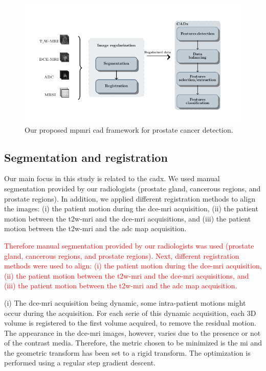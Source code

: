 \documentclass[a4paper,num-refs]{wiley-article}
\begin{document}
\begin{figure}
  \centering
  \includegraphics[width=0.7\linewidth]{./images/cad/wkfcad.pdf}
  \caption{Our proposed \ac{mpmri} \ac{cad} framework for prostate cancer
    detection.}
  \label{fig:wkfcad}
\end{figure}

\subsection{Segmentation and registration}

Our main focus in this study is related to the \ac{cadx}. We used manual
segmentation provided by our radiologists (prostate gland, cancerous regions,
and prostate regions). In addition, we applied different registration methods
to align the images: (i) the patient motion during the \ac{dce}-\ac{mri}
acquisition, (ii) the patient motion between the \ac{t2w}-\ac{mri} and the
\ac{dce}-\ac{mri} acquisitions, and (iii) the patient motion between the
\ac{t2w}-\ac{mri} and the \ac{adc} map acquisition.

\textcolor{red}{Therefore manual segmentation provided by our radiologists was
  used (prostate gland, cancerous regions, and prostate regions).  Next,
  different registration methods were used to align: (i) the patient motion
  during the \ac{dce}-\ac{mri} acquisition, (ii) the patient motion between the
  \ac{t2w}-\ac{mri} and the \ac{dce}-\ac{mri} acquisitions, and (iii) the
  patient motion between the \ac{t2w}-\ac{mri} and the \ac{adc} map
  acquisition.}

(i) The \ac{dce}-\ac{mri} acquisition being dynamic, some intra-patient motions
might occur during the acquisition. For each serie of this dynamic
acquisition, each 3D volume is registered to the first volume acquired, to
remove the residual motion. The appearance in the \ac{dce}-\ac{mri} images,
however, varies due to the presence or not of the contrast media. Therefore,
the metric chosen to be minimized is the \ac{mi} and the geometric transform
has been set to a rigid transform. The optimization is performed using a
regular step gradient descent.
\end{document}

